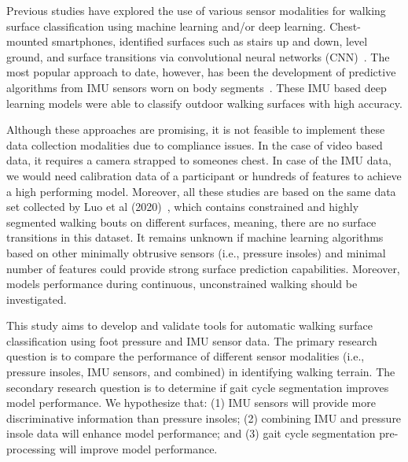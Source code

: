 \documentclass[sensors,article,submit,pdftex,moreauthors]{Definitions/mdpi}
\begin{document}
Previous studies have explored the use of various sensor modalities for walking surface classification using machine learning and/or deep learning. Chest-mounted smartphones, identified surfaces such as stairs up and down, level ground, and surface transitions via convolutional neural networks (CNN)~\cite{Laschowski_2022}.
The most popular approach to date, however, has been the development of predictive algorithms from IMU sensors worn on body segments~\cite{Shah_2022, chauhan2025classifying, yildiz2023towards}. These IMU based deep learning models were able to classify outdoor walking surfaces with high accuracy.

Although these approaches are promising, it is not feasible to implement these data collection modalities due to compliance issues. In the case of video based data, it requires a camera strapped to someones chest. In case of the IMU data, we would need calibration data of a participant or hundreds of features to achieve a high performing model. Moreover, all these studies are based on the same data set collected by Luo et al (2020)~\cite{Luo_2020}, which contains constrained and highly segmented walking bouts on different surfaces, meaning, there are no surface transitions in this dataset. 
It remains unknown if machine learning algorithms based on other minimally obtrusive sensors (i.e., pressure insoles) and minimal number of features could provide strong surface prediction capabilities. Moreover, models performance during continuous, unconstrained walking should be investigated.  

This study aims to develop and validate tools for automatic walking surface classification using foot pressure and IMU sensor data. The primary research question is to compare the performance of different sensor modalities (i.e., pressure insoles, IMU sensors, and combined) in identifying walking terrain. The secondary research question is to determine if gait cycle segmentation improves model performance. We hypothesize that: (1) IMU sensors will provide more discriminative information than pressure insoles; (2) combining IMU and pressure insole data will enhance model performance; and (3) gait cycle segmentation pre-processing will improve model performance.
\end{document}

